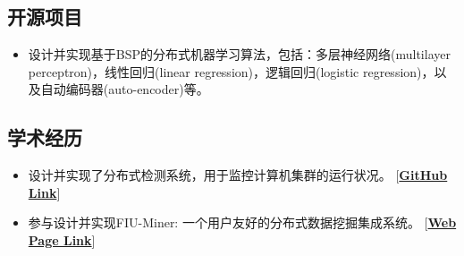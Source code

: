 \documentclass[11pt,a4paper,sans]{moderncv}
\begin{document}
\subsection{开源项目}
{
\begin{itemize}
\item 设计并实现基于BSP的分布式机器学习算法，包括：多层神经网络(multilayer perceptron)，线性回归(linear regression)，逻辑回归(logistic regression)，以及自动编码器(auto-encoder)等。
\end{itemize}
} %
\subsection{学术经历}
{
\begin{itemize}\itemsep 0.05in
\item 设计并实现了分布式检测系统，用于监控计算机集群的运行状况。
		[\textbf{\href{https://github.com/yxjiang/system-monitoring}{GitHub Link}}]
\item	参与设计并实现FIU-Miner: 一个用户友好的分布式数据挖掘集成系统。
[\textbf{\href{http://datamining-node08.cs.fiu.edu/FIU-Miner}{Web Page Link}}]
\end{itemize}
} %
\end{document}
